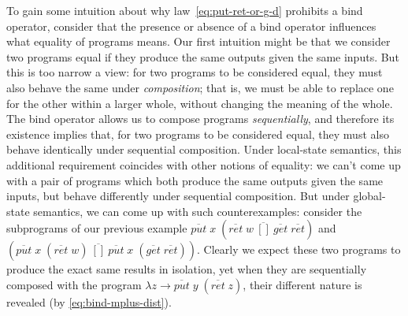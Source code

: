 \documentclass{jfp}
\newcommand{\Varid}[1]{\mathit{#1}}
\let\Varid\mathit
\begin{document}
To gain some intuition about why law~\eqref{eq:put-ret-or-g-d} prohibits a bind
operator, consider that the presence or absence of a bind operator influences
what equality of programs means.
Our first intuition might be that we consider two programs equal if they produce
the same outputs given the same inputs. But this is too narrow a view: for
two programs to be considered equal, they must also behave the same under
\emph{composition}; that is, we must be able to replace one for the other within
a larger whole, without changing the meaning of the whole.
The bind operator allows us to compose programs \emph{sequentially}, and
therefore its existence implies that, for two programs to be considered equal,
they must also behave identically under sequential composition.
Under local-state semantics, this additional requirement coincides with other
notions of equality: we can't come up with a pair of
programs which both produce the same outputs given the same inputs, but behave
differently under sequential composition.
But under global-state semantics, we can come up with such counterexamples:
consider the subprograms of our previous example
\ensuremath{\overline{\Varid{put}}\;\Varid{x}\;(\overline{\Varid{ret}}\;\Varid{w}~\overline{[\!]}~\overline{\Varid{get}}\;\overline{\Varid{ret}})} and
\ensuremath{(\overline{\Varid{put}}\;\Varid{x}\;(\overline{\Varid{ret}}\;\Varid{w})~\overline{[\!]}~\overline{\Varid{put}}\;\Varid{x}\;(\overline{\Varid{get}}\;\overline{\Varid{ret}}))}.
Clearly we expect these two programs to produce the exact same results in
isolation, yet when they are sequentially composed with the program
\ensuremath{\lambda \Varid{z}\to \overline{\Varid{put}}\;\Varid{y}\;(\overline{\Varid{ret}}\;\Varid{z})}, their different nature is revealed (by \eqref{eq:bind-mplus-dist}).
\end{document}
